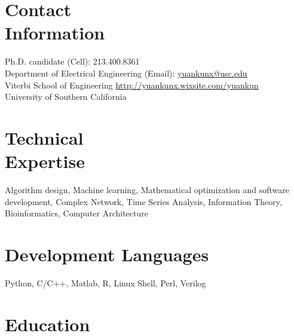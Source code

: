 \documentclass[margin,line]{cv}
\begin{document}
\begin{resume}
    \section{\mysidestyle Contact\\Information}
    Ph.D. candidate                                                                     \hfill (Cell): 213.400.8361\\%
    Department of Electrical Engineering                                                    \hfill (Email): \url{yuankunx@usc.edu}\\%
    Viterbi School of Engineering                       \hfill    \url{http://yuankunx.wixsite.com/yuankun}\\%
    University of Southern California                                                                                       \hfill \\%

    \section{\mysidestyle Technical\\Expertise}

    Algorithm design, Machine learning, Mathematical optimization and software development, Complex Network, Time Series Analysis, Information Theory, Bioinformatics, Computer Architecture
    
    \section{\mysidestyle Development Languages}

    Python, C/C++, Matlab, R, Linux Shell, Perl, Verilog
    \section{\mysidestyle Education}


\end{resume}
\end{document}

